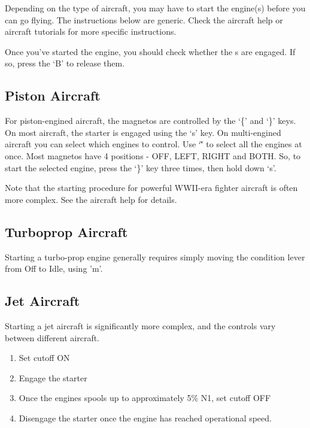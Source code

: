 Depending on the type of aircraft, you may have to start the engine(s) before you can
go flying. The instructions below are generic. Check the aircraft help or aircraft tutorials
for more specific instructions.

Once you've started the engine, you should check whether the s are engaged.
If so, press the `B' to release them.

\subsection{Piston Aircraft}

For piston-engined aircraft, the magnetos are controlled by the `\{' and `\}' keys. On most aircraft, the starter is engaged using the `s' key. On multi-engined aircraft you can select which engines to control. Use `\~' to select all the engines at once. Most magnetos have 4 positions -
OFF, LEFT, RIGHT and BOTH. So, to start the selected engine, press the `\}' key three times, then hold down `s'.

Note that the starting procedure for powerful WWII-era fighter aircraft is often more complex. See the aircraft help for details.

\subsection{Turboprop Aircraft}

Starting a turbo-prop engine generally requires simply moving the condition lever from Off to Idle, using 'm'.

\subsection{Jet Aircraft}

Starting a jet aircraft is significantly more complex, and the controls vary between different aircraft.

\begin{enumerate}
\item Set cutoff ON
\item Engage the starter
\item Once the engines spools up to approximately 5\% N1, set cutoff OFF
\item Disengage the starter once the engine has reached operational speed.
\end{enumerate}

